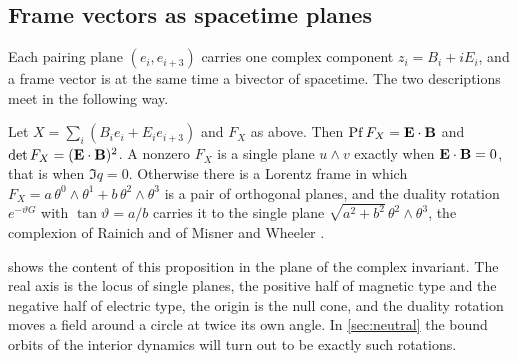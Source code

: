 \subsection{Frame vectors as spacetime planes}

Each pairing plane $(e_i,e_{i+3})$ carries one complex component $z_i=B_i+iE_i$, and a frame vector is at the same time a bivector of
spacetime. The two descriptions meet in the following way.

\begin{proposition}
\label{prop:planes}
Let $X=\sum_i(B_ie_i+E_ie_{i+3})$ and $F_X$ as above. Then $\operatorname{Pf} F_X=\mathbf E\cdot\mathbf B$ and $\det F_X=(\mathbf E\cdot\mathbf B)^2$. A nonzero $F_X$ is a
single plane $u\wedge v$ exactly when $\mathbf E\cdot\mathbf B=0$, that is when $\Im q=0$. Otherwise there is a Lorentz frame in which
$F_X=a\,\theta^0\wedge\theta^1+b\,\theta^2\wedge\theta^3$ is a pair of orthogonal planes, and the duality rotation $e^{-\vartheta G}$ with
$\tan\vartheta=a/b$ carries it to the single plane $\sqrt{a^2+b^2}\,\theta^2\wedge\theta^3$, the complexion of Rainich and of Misner
and Wheeler \cite{Rainich1925,MisnerWheeler57}.
\end{proposition}

 shows the content of this proposition in the plane of the complex invariant. The real axis is the locus of single
planes, the positive half of magnetic type and the negative half of electric type, the origin is the null cone, and the duality
rotation moves a field around a circle at twice its own angle. In \cref{sec:neutral} the bound orbits of the interior dynamics will
turn out to be exactly such rotations.

